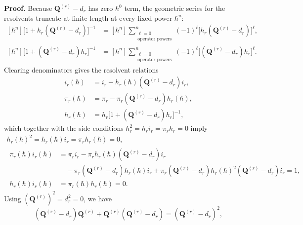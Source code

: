 \documentclass[11pt]{article}
\numberwithin{equation}{section}
\numberwithin{figure}{section}
\numberwithin{table}{section}
\begin{document}
\begin{proofbox}
\textbf{Proof.} Because $\mathbf Q^{(r)}-d_r$ has zero $\hbar^0$ term, the geometric series for the resolvents truncate at finite length at every fixed power $\hbar^n$:
\begin{equation}\label{eq-ch8-transfer-inverses}
\begin{aligned}
[\hbar^n]\bigl[1+h_r(\mathbf Q^{(r)}-d_r)\bigr]^{-1}
&=[\hbar^n]\sum_{\substack{\ell=0\\\text{operator powers}}}^{n}
(-1)^\ell\bigl[h_r(\mathbf Q^{(r)}-d_r)\bigr]^\ell,\\
[\hbar^n]\bigl[1+(\mathbf Q^{(r)}-d_r)h_r\bigr]^{-1}
&=[\hbar^n]\sum_{\substack{\ell=0\\\text{operator powers}}}^{n}
(-1)^\ell\bigl[(\mathbf Q^{(r)}-d_r)h_r\bigr]^\ell.
\end{aligned}
\end{equation}
Clearing denominators gives the resolvent relations
\begin{equation}\label{eq-ch8-transfer-resolvent-identities}
\begin{aligned}
i_r(\hbar)&=i_r-h_r(\hbar)(\mathbf Q^{(r)}-d_r)i_r,\\
\pi_r(\hbar)&=\pi_r-\pi_r(\mathbf Q^{(r)}-d_r)h_r(\hbar),\\
h_r(\hbar)&=h_r\bigl[1+(\mathbf Q^{(r)}-d_r)h_r\bigr]^{-1},
\end{aligned}
\end{equation}
which together with the side conditions $h_r^2=h_ri_r=\pi_rh_r=0$ imply
\begin{equation}\label{eq-ch8-transfer-retraction-proof}
\begin{gathered}
h_r(\hbar)^2=h_r(\hbar)i_r=\pi_rh_r(\hbar)=0,\\
\begin{aligned}
\pi_r(\hbar)i_r(\hbar)
&=\pi_ri_r-\pi_rh_r(\hbar)(\mathbf Q^{(r)}-d_r)i_r\\
&\quad-\pi_r(\mathbf Q^{(r)}-d_r)h_r(\hbar)i_r
+\pi_r(\mathbf Q^{(r)}-d_r)h_r(\hbar)^2(\mathbf Q^{(r)}-d_r)i_r=1,\\
h_r(\hbar)i_r(\hbar)&=\pi_r(\hbar)h_r(\hbar)=0.
\end{aligned}
\end{gathered}
\end{equation}
Using $(\mathbf Q^{(r)})^2=d_r^2=0$, we have
\begin{equation}\label{eq-ch8-transfer-perturbation-algebra}
(\mathbf Q^{(r)}-d_r)\mathbf Q^{(r)}
+\mathbf Q^{(r)}(\mathbf Q^{(r)}-d_r)
=(\mathbf Q^{(r)}-d_r)^2,

\end{equation}
\end{proofbox}
\end{document}
